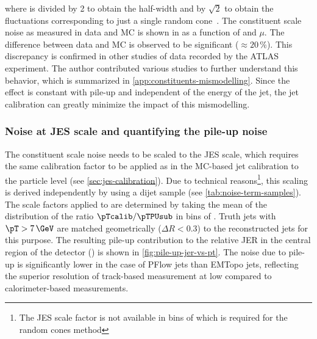 where \sigmaRC is divided by 2 to obtain the half-width and by $\sqrt{2}$ to obtain the fluctuations corresponding to just a single random cone~\cite{JETM-2018-05}.
The constituent scale noise as measured in data and MC is shown in  as a function of \abseta and $\mu$.
The difference between data and MC is observed to be significant ($\approx 20\,\%$). This discrepancy is confirmed in other studies of data recorded by the ATLAS experiment. The author contributed various studies to further understand this behavior, which is summarized in \cref{app:constituents-mismodelling}. 
Since the effect is constant with pile-up and independent of the energy of the jet, the jet calibration can greatly minimize the impact of this mismodelling. 


\subsubsection{Noise at JES scale and quantifying the pile-up noise}
The constituent scale noise needs to be scaled to the JES scale, which requires the same calibration factor to be applied as in the MC-based jet calibration to the particle level (see \cref{sec:jes-calibration}).
Due to technical reasons\footnote{The JES scale factor is not available in bins of \pTtruth which is required for the random cones method}, this scaling is derived independently by using a dijet sample (see \cref{tab:noise-term-samples}). The scale factors applied to \Npileupconstscale are determined by taking the mean of the distribution of the ratio $\pTcalib / \pTPUsub$ in bins of \pTtruth. Truth jets with $\pT > 7\,\GeV$ are matched geometrically ($\Delta R < 0.3$) to the reconstructed jets for this purpose.
The resulting pile-up contribution to the relative JER in the central region of the detector () is shown in \cref{fig:pile-up-jer-vs-pt}.
The noise due to pile-up is significantly lower in the case of PFlow jets than EMTopo jets, reflecting the superior resolution of track-based measurement at low \pT compared to calorimeter-based measurements.


